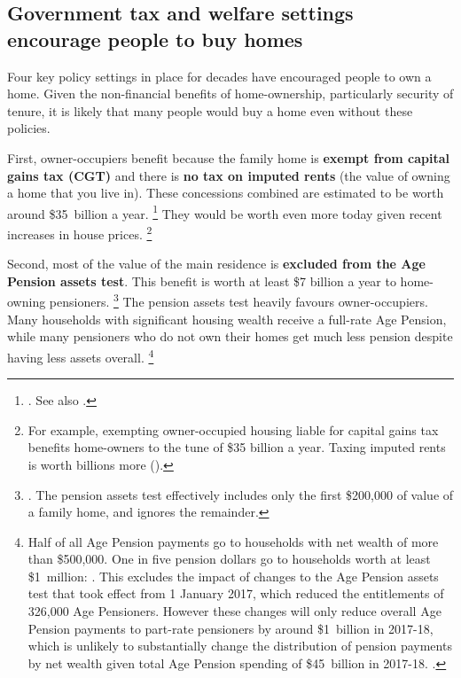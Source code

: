 \subsection{Government tax and welfare settings encourage people to buy homes }\label{subsec:government-policy-settings-encourage-people-to-buy-homes}

Four key policy settings in place for decades have encouraged people to own a home.
Given the non-financial benefits of home-ownership, particularly security of tenure, it is likely that many people would buy a home even without these policies.

First, owner-occupiers benefit because the family home is \textbf{exempt from capital gains tax (CGT)} and there is \textbf{no tax on imputed rents} (the value of owning a home that you live in).
These concessions combined are estimated to be worth around \$35~billion a year.%
    \footnote{. See also \textcite[][23]{KellyHarrisonHunterEtAl2013}.}
They would be worth even more today given recent increases in house prices.%
    \footnote{For example, exempting owner-occupied housing liable for capital gains tax benefits home-owners to the tune of \$35 billion a year. Taxing imputed rents is worth billions more (\textcite[][88--89]{Treasury-2017-TES-for-2016}).}

Second, most of the value of the main residence is \textbf{excluded from the Age Pension assets test}.
This benefit is worth at least \$7 billion a year to home-owning pensioners.%
    \footnote{\textcite{DaleyEtAl-2013-BalancingBudgets}.
	The pension assets test effectively includes only the first \$200,000 of value of a family home, and ignores the remainder.}
The pension assets test heavily favours owner-occupiers. Many households with significant housing wealth receive a full-rate Age Pension, while many pensioners who do not own their homes get much less pension despite having less assets overall.%
    \footnote{Half of all Age Pension payments go to households with net wealth of more than \$500,000.
	One in five pension dollars go to households worth at least \$1~million: \textcites[][37]{DaleyEtAl-2013-BalancingBudgets}[][21]{Daley2017implicationsageing}. This excludes the impact of changes to the Age Pension assets test that took effect from 1 January 2017, which reduced the entitlements of 326,000 Age Pensioners.
	However these changes will only reduce overall Age Pension payments to part-rate pensioners by around \$1~billion in 2017-18, which is unlikely to substantially change the distribution of pension payments by net wealth given total Age Pension spending of \$45~billion in 2017-18. \textcites{FairerAccess2017MorrisonMediaRelease}[][6--27]{Budget2017-18-BP1}.}

